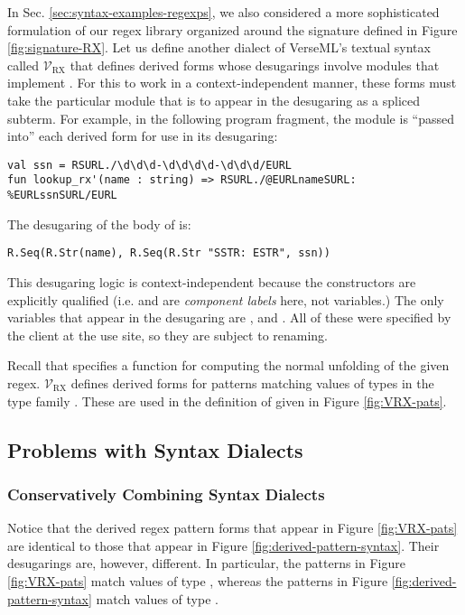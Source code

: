{In Sec. \ref{sec:syntax-examples-regexps}, we also considered a more sophisticated formulation of our regex library organized around the signature  defined in Figure \ref{fig:signature-RX}. Let us define another dialect of VerseML's textual syntax called $\mathcal{V}_\text{RX}$ that defines derived forms whose desugarings involve modules that implement . For this to work in a  context-independent manner, these forms must take the particular module that is to appear in the desugaring as a spliced subterm. For example, in the following program fragment, the module  is ``passed into'' each derived form for use in its desugaring:
\begin{lstlisting}[numbers=none]
val ssn = RSURL./\d\d\d-\d\d\d\d-\d\d\d/EURL
fun lookup_rx'(name : string) => RSURL./@EURLnameSURL: %EURLssnSURL/EURL
\end{lstlisting}
The desugaring of the body of  is:
\begin{lstlisting}[numbers=none]
R.Seq(R.Str(name), R.Seq(R.Str "SSTR: ESTR", ssn))
\end{lstlisting}
This desugaring logic is context-independent because the constructors are explicitly qualified (i.e.  and  are \emph{component labels} here, not variables.) The only variables that appear in the desugaring are ,  and . All of these were specified by the client at the use site, so they are subject to renaming.

Recall that  specifies a function  for computing the normal unfolding of the given regex. $\mathcal{V}_\text{RX}$ defines derived forms for patterns matching values of types in the type family . These are used in the definition of  given in Figure \ref{fig:VRX-pats}.




\subsection{Problems with Syntax Dialects}\label{sec:problems-with-syntax-dialects}
\subsubsection{Conservatively Combining Syntax Dialects}

Notice that the derived regex pattern forms that appear in Figure \ref{fig:VRX-pats} are identical to those that appear in Figure \ref{fig:derived-pattern-syntax}. Their desugarings are, however, different. In particular, the patterns in Figure \ref{fig:VRX-pats} match values of type , whereas the patterns in Figure \ref{fig:derived-pattern-syntax} match values of type . 

}
